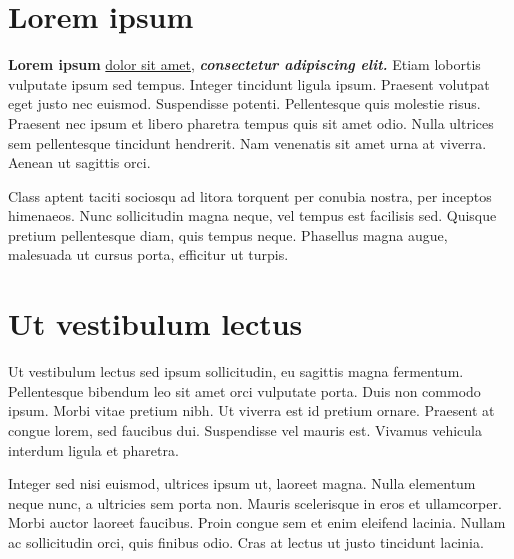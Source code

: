 \section*{Lorem ipsum}

\begin{flushleft}
\textbf{Lorem ipsum} \underline{dolor sit amet,} \textbf{\textit{consectetur adipiscing elit.}} Etiam lobortis vulputate ipsum sed tempus. Integer tincidunt ligula ipsum. Praesent volutpat eget justo nec euismod. Suspendisse potenti. Pellentesque quis molestie risus. Praesent nec ipsum et libero pharetra tempus quis sit amet odio. Nulla ultrices sem pellentesque tincidunt hendrerit. Nam venenatis sit amet urna at viverra. Aenean ut sagittis orci.\par Class aptent taciti sociosqu ad litora torquent per conubia nostra, per inceptos himenaeos. Nunc sollicitudin magna neque, vel tempus est facilisis sed. Quisque pretium pellentesque diam, quis tempus neque. Phasellus magna augue, malesuada ut cursus porta, efficitur ut turpis.
\end{flushleft}

\section*{Ut vestibulum lectus}

\begin{flushleft}

Ut vestibulum lectus sed ipsum sollicitudin, eu sagittis magna fermentum. Pellentesque bibendum leo sit amet orci vulputate porta. Duis non commodo ipsum. Morbi vitae pretium nibh. Ut viverra est id pretium ornare. Praesent at congue lorem, sed faucibus dui. Suspendisse vel mauris est. Vivamus vehicula interdum ligula et pharetra.\par Integer sed nisi euismod, ultrices ipsum ut, laoreet magna. Nulla elementum neque nunc, a ultricies sem porta non. Mauris scelerisque in eros et ullamcorper. Morbi auctor laoreet faucibus. Proin congue sem et enim eleifend lacinia. Nullam ac sollicitudin orci, quis finibus odio. Cras at lectus ut justo tincidunt lacinia.
\end{flushleft}

